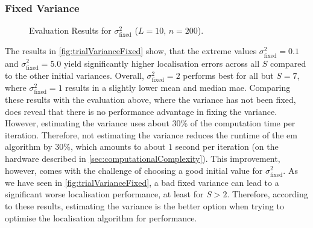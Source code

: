 \subsubsection*{Fixed Variance}

\begin{figure}[H]
\iftoggle{quick}{
    \texttt{[image: plots/boxplots/boxplot-joined-var-val]}
}{%
    
}
	\caption[Evaluation Results for $\sigma^2_{\text{fixed}}$]{Evaluation Results for $\sigma^2_{\text{fixed}}$ ($L=10$, $n=200$).}
	\label{fig:trialVarianceFixed}
\end{figure}

The results in \autoref{fig:trialVarianceFixed} show, that the extreme values $\sigma^2_{\text{fixed}}=0.1$ and $\sigma^2_{\text{fixed}}=5.0$ yield significantly higher localisation errors across all $S$ compared to the other initial variances. Overall, $\sigma^2_{\text{fixed}}=2$ performs best for all but $S=7$, where $\sigma^2_{\text{fixed}}=1$ results in a slightly lower mean and median \gls{mae}. Comparing these results with the evaluation above, where the variance has not been fixed, does reveal that there is no performance advantage in fixing the variance. However, estimating the variance uses about 30\% of the computation time per iteration. Therefore, not estimating the variance reduces the runtime of the \gls{em} algorithm by 30\%, which amounts to about $1$ second per iteration (on the hardware described in \autoref{sec:computationalComplexity}). This improvement, however, comes with the challenge of choosing a good initial value for $\sigma^2_{\text{fixed}}$. As we have seen in \autoref{fig:trialVarianceFixed}, a bad fixed variance can lead to a significant worse localisation performance, at least for $S>2$. Therefore, according to these results, estimating the variance is the better option when trying to optimise the localisation algorithm for performance.